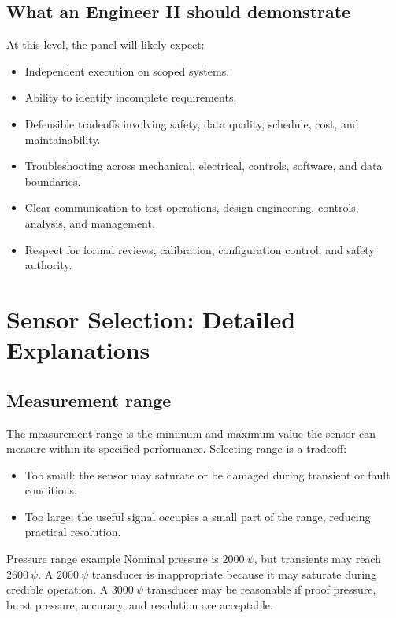 \documentclass[11pt]{article}
\begin{document}
\subsection{What an Engineer II should demonstrate}
At this level, the panel will likely expect:
\begin{itemize}
  \item Independent execution on scoped systems.
  \item Ability to identify incomplete requirements.
  \item Defensible tradeoffs involving safety, data quality, schedule, cost, and maintainability.
  \item Troubleshooting across mechanical, electrical, controls, software, and data boundaries.
  \item Clear communication to test operations, design engineering, controls, analysis, and management.
  \item Respect for formal reviews, calibration, configuration control, and safety authority.
\end{itemize}

\section{Sensor Selection: Detailed Explanations}

\subsection{Measurement range}
The measurement range is the minimum and maximum value the sensor can measure
within its specified performance. Selecting range is a tradeoff:
\begin{itemize}
  \item Too small: the sensor may saturate or be damaged during transient or fault conditions.
  \item Too large: the useful signal occupies a small part of the range, reducing practical resolution.
\end{itemize}

\begin{examplebox}{Pressure range example}
Nominal pressure is \(2000~\psi\), but transients may reach \(2600~\psi\).
A \(2000~\psi\) transducer is inappropriate because it may saturate during
credible operation. A \(3000~\psi\) transducer may be reasonable if proof
pressure, burst pressure, accuracy, and resolution are acceptable.
\end{examplebox}
\end{document}
